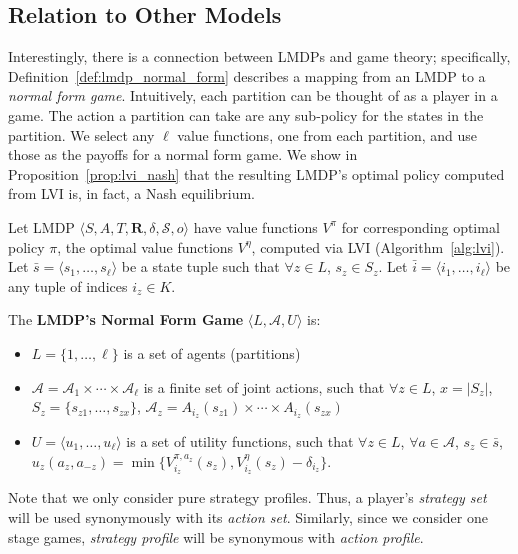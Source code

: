 \subsection{Relation to Other Models}

Interestingly, there is a connection between LMDPs and game theory; specifically, Definition~\ref{def:lmdp_normal_form} describes a mapping from an LMDP to a \emph{normal form game}. Intuitively, each partition can be thought of as a player in a game. The action a partition can take are any sub-policy for the states in the partition. We select any $\ell$ value functions, one from each partition, and use those as the payoffs for a normal form game. We show in Proposition~\ref{prop:lvi_nash} that the resulting LMDP's optimal policy computed from LVI is, in fact, a Nash equilibrium.


\begin{definition}
    \label{def:lmdp_normal_form}
    Let LMDP $\langle S, A, T, \mathbf{R}, \delta, \mathcal{S}, o \rangle$ have value functions $V^\pi$ for corresponding optimal policy $\pi$, the optimal value functions $V^\eta$, computed via LVI (Algorithm~\ref{alg:lvi}). Let $\bar{s} = \langle s_1, \ldots, s_\ell \rangle$ be a state tuple such that $\forall z \in L$, $s_z \in S_z$. Let $\bar{i} = \langle i_1, \ldots, i_\ell \rangle$ be any tuple of indices $i_z \in K$.

    The \textbf{LMDP's Normal Form Game} $\langle L, \mathcal{A}, U \rangle$ is:
    \begin{itemize}
        \item $L = \{1, \ldots, \ell\}$ is a set of agents (partitions)
        \item $\mathcal{A} = \mathcal{A}_1 \times \cdots \times \mathcal{A}_\ell$ is a finite set of joint actions, such that $\forall z \in L$, $x = |S_z|$, $S_z = \{s_{z1}, \ldots, s_{zx}\}$, $\mathcal{A}_z = A_{i_z}(s_{z1}) \times \cdots \times A_{i_z}(s_{zx})$
        \item $U = \langle u_1, \ldots, u_\ell \rangle$ is a set of utility functions, such that $\forall z \in L$, $\forall a \in \mathcal{A}$, $s_z \in \bar{s}$, $u_z(a_z, a_{-z}) = \min \{ V_{i_z}^{\pi, a_z} (s_z), V_{i_z}^\eta (s_z) - \delta_{i_z} \}$.
    \end{itemize}
\end{definition}

Note that we only consider pure strategy profiles. Thus, a player's \emph{strategy set} will be used synonymously with its \emph{action set}. Similarly, since we consider one stage games, \emph{strategy profile} will be synonymous with \emph{action profile}.


